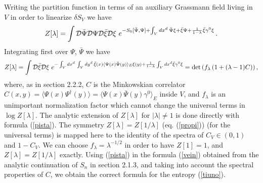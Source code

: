\documentclass[11pt]{article}
\begin{document}
 
Writing the partition function in terms of an auxiliary Grassmann field living in $V$ in order to linearize $\delta S_V$ we have
\begin{equation}
 Z[\lambda]=\int {\cal D}\bar{\Psi}{\cal D}\Psi{\cal D}\bar{\xi} {\cal D} \xi\,\, e^{-S_0[\bar{\Psi},\Psi]+\int_V dx^d \, \bar{\Psi} \xi + \bar \xi  \Psi+ \frac{1}{1-\lambda}\bar{\xi} \gamma^0\xi}\,. \label{niu}
\end{equation}
Integrating first over $\Psi$, $\bar{\Psi}$ we have 
\begin{equation}
 Z[\lambda]=\int {\cal D}\bar{\xi} {\cal D} \xi\,\, e^{-\int_V dx^d \,\int_V dy^d \,\bar{\xi}(x) \langle \Psi(x) \bar{\Psi}(y)\rangle_E \xi(y) +  \frac{1}{1-\lambda}\int_V dx^d \bar{\xi} \gamma^0\xi}=\det\left(f_\lambda \left(1+(\lambda-1) C\right)\right), \label{pista}
\end{equation}
where, as in section 2.2.2, $C$ is the Minkowskian correlator $C(x,y)=\langle\Psi(x)\Psi^\dagger(y)\rangle=\langle\Psi(x)\bar{\Psi}(y)\gamma^0\rangle_E$ inside $V$, and $f_\lambda$ is an unimportant normalization factor which cannot change the universal terms in $\log Z[\lambda]$. The analytic extension of $Z[\lambda]$ for $|\lambda|\neq 1$ is done directly with formula (\ref{pista}). The symmetry $Z[\lambda]=Z[1/\lambda]$ (eq. (\ref{propi})) (for the universal terms) is mapped here  to the identity of the spectra of $C_V\in (0,1)$ and $1-C_V$.
We can choose $f_\lambda=\lambda^{-1/2}$ in order to have $Z[1]=1$, and $Z[\lambda]=Z[1/\lambda]$ exactly.  Using (\ref{pista}) in the formula (\ref{vein}) obtained from the analytic continuation of $S_n$ in section 2.1.3, and taking into account the spectral properties of $C$, we obtain the correct formula for the entropy (\ref{tiuno}).
\end{document}
